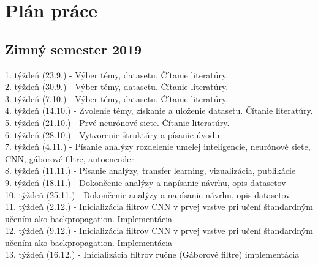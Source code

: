 \setcounter{figure}{0}
\setcounter{listing}{0}

\chapter{Plán práce \label{cha:chapter1} }

\begin{refsegment}

\section{Zimný semester 2019}
1. týždeň (23.9.) - Výber témy, datasetu. Čítanie literatúry.\\ 
2. týždeň (30.9.) -	Výber témy, datasetu. Čítanie literatúry.\\ 
3. týždeň (7.10.) - Výber témy, datasetu. Čítanie literatúry.\\ 
4. týždeň (14.10.) - Zvolenie témy, získanie a uloženie datasetu. Čítanie literatúry. \\
5. týždeň (21.10.) - Prvé neurónové siete. Čítanie literatúry. \\ 
6. týždeň (28.10.) - Vytvorenie štruktúry a písanie úvodu \\
7. týždeň (4.11.) - Písanie analýzy rozdelenie umelej inteligencie, neurónové siete, CNN, gáborové filtre, autoencoder \\
8. týždeň (11.11.) - Písanie analýzy, transfer learning, vizualizácia, publikácie \\
9. týždeň (18.11.) - Dokončenie analýzy a napísanie návrhu, opis datasetov \\
10. týždeň (25.11.) - Dokončenie analýzy a napísanie návrhu, opis datasetov \\
11. týždeň (2.12.) - Inicializácia filtrov CNN v prvej vrstve pri učení štandardným učením ako backpropagation. Implementácia \\
12. týždeň (9.12.) - Inicializácia filtrov CNN v prvej vrstve pri učení štandardným učením ako backpropagation. Implementácia \\
13. týždeň (16.12.) - Inicializácia filtrov ručne (Gáborové filtre) implementácia \\
% 

\printbibliography[heading=referencessec,segment=\therefsegment,resetnumbers=true]

\end{refsegment}